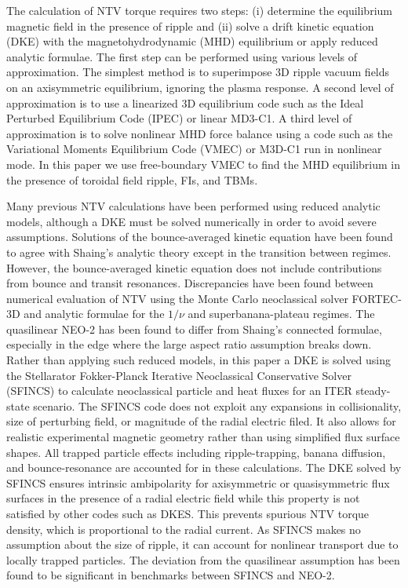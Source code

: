 \documentclass[aip, pop, preprint]{revtex4-1}
\numberwithin{figure}{section}
\numberwithin{equation}{section}
\begin{document}
The calculation of NTV torque requires two steps: (i) determine the equilibrium magnetic field in the presence of ripple and (ii) solve a drift kinetic equation (DKE) with the magnetohydrodynamic (MHD) equilibrium or apply reduced analytic formulae. The first step can be performed using various levels of approximation. The simplest method is to superimpose 3D ripple vacuum fields on an axisymmetric equilibrium, ignoring the plasma response.  A second level of approximation is to use a linearized 3D equilibrium code such as the Ideal Perturbed Equilibrium Code (IPEC)\cite{Park2009} or linear MD3-C1.\cite{Jardin2008} A third level of approximation is to solve nonlinear MHD force balance using a code such as the Variational Moments Equilibrium Code (VMEC)\cite{Hirshman1986a} or M3D-C1\cite{Ferraro2010} run in nonlinear mode. In this paper we use free-boundary VMEC to find the MHD equilibrium in the presence of toroidal field ripple, FIs, and TBMs. 

Many previous NTV calculations\cite{Zhu2006,Hua2010,Cole2011,Park2009} have been performed using reduced analytic models, although a DKE must be solved numerically in order to avoid severe assumptions. Solutions of the bounce-averaged kinetic equation have been found to agree with Shaing's analytic theory except in the transition between regimes.\cite{Sun2010} However, the bounce-averaged kinetic equation does not include contributions from bounce and transit resonances. Discrepancies have been found between numerical evaluation of NTV using the Monte Carlo neoclassical solver FORTEC-3D and analytic formulae for the $1/\nu$ and superbanana-plateau regimes.\cite{Satake2011a,Satake2011b} The quasilinear NEO-2 has been found to differ from Shaing's connected formulae,\cite{Shaing2010} especially in the edge where the large aspect ratio assumption breaks down.\cite{Martitsch2016} Rather than applying such reduced models, in this paper a DKE is solved using the Stellarator Fokker-Planck Iterative Neoclassical Conservative Solver (SFINCS) \cite{Landreman2014} to calculate neoclassical particle and heat fluxes for an ITER steady-state scenario. The SFINCS code does not exploit any expansions in collisionality, size of perturbing field, or magnitude of the radial electric filed. It also allows for realistic experimental magnetic geometry rather than using simplified flux surface shapes. All trapped particle effects including ripple-trapping,\cite{Stringer1972} banana diffusion,\cite{Linsker1982} and bounce-resonance\cite{Linsker1982} are accounted for in these calculations. The DKE solved by SFINCS ensures intrinsic ambipolarity for axisymmetric or quasisymmetric flux surfaces in the presence of a radial electric field while this property is not satisfied by other codes such as DKES.\cite{Hirshman1986b,Rij1989} This prevents spurious NTV torque density, which is proportional to the radial current. As SFINCS makes no assumption about the size of ripple, it can account for nonlinear transport due to locally trapped particles. The deviation from the quasilinear assumption has been found to be significant in benchmarks between SFINCS and NEO-2.\cite{Martitsch2016}
\end{document}
